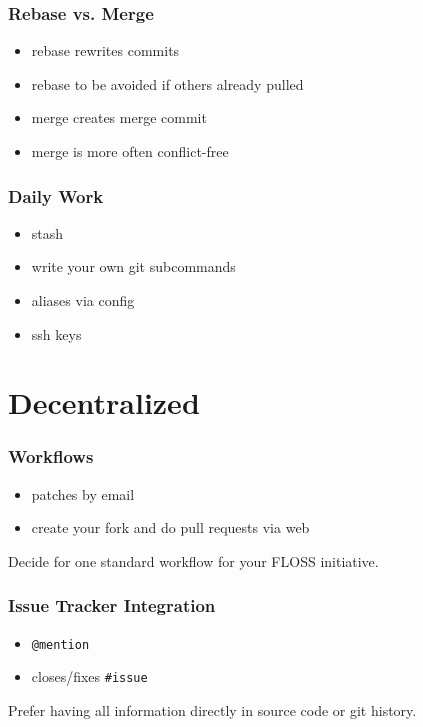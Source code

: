 \begin{frame}
	\frametitle{Rebase vs. Merge}

	\begin{itemize}
		\item rebase rewrites commits
		\item rebase to be avoided if others already pulled
		\item merge creates merge commit
		\item merge is more often conflict-free
	\end{itemize}
\end{frame}

\begin{frame}
	\frametitle{Daily Work}

	\begin{itemize}
		\item stash
		\item write your own git subcommands
		\item aliases via config
		\item ssh keys
	\end{itemize}
\end{frame}


\section{Decentralized}

\begin{frame}
	\frametitle{Workflows}

	\begin{itemize}
		\item patches by email
		\item create your fork and do pull requests via web
	\end{itemize}

	\begin{finding}
	Decide for one standard workflow for your FLOSS initiative.
	\end{finding}
\end{frame}

\begin{frame}[fragile]
	\frametitle{Issue Tracker Integration}

	\begin{itemize}
		\item \verb+@mention+
		\item closes/fixes \verb+#issue+
	\end{itemize}

	\begin{finding}
	Prefer having all information directly in source code or git history.
	\end{finding}
\end{frame}

